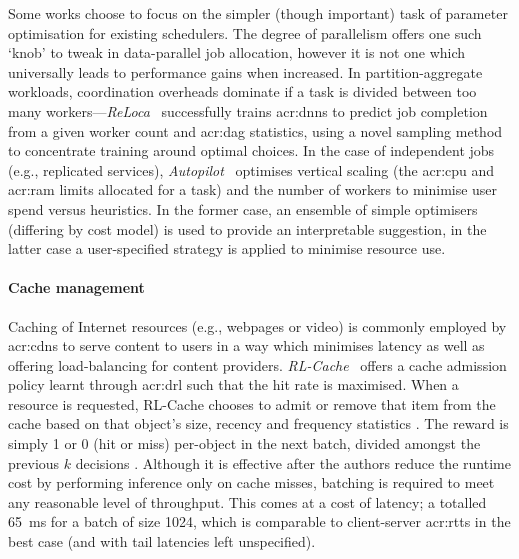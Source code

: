 Some works choose to focus on the simpler (though important) task of parameter optimisation for existing schedulers.
The degree of parallelism offers one such `knob' to tweak in data-parallel job allocation, however it is not one which universally leads to performance gains when increased.
In partition-aggregate workloads, coordination overheads dominate if a task is divided between too many workers---\emph{ReLoca}~\parencite{DBLP:conf/infocom/HuLZC20} successfully trains \glspl{acr:dnn} to predict job completion from a given worker count and \gls{acr:dag} statistics, using a novel sampling method to concentrate training around optimal choices.
In the case of independent jobs (e.g., replicated services), \emph{Autopilot}~\parencite{DBLP:conf/eurosys/RzadcaFSZBKNSWH20} optimises vertical scaling (the \gls{acr:cpu} and \gls{acr:ram} limits allocated for a task) and the number of workers to minimise user spend versus heuristics.
In the former case, an ensemble of simple optimisers (differing by cost model) is used to provide an interpretable suggestion, in the latter case a user-specified strategy is applied to minimise resource use.

\paragraph{Cache management}
Caching of Internet resources (e.g., webpages or video) is commonly employed by \glspl{acr:cdn} to serve content to users in a way which minimises latency as well as offering load-balancing for content providers.
\emph{RL-Cache}~\parencite{DBLP:journals/jsac/KirilinSGS20} offers a cache admission policy learnt through \gls{acr:drl} such that the hit rate is maximised.
When a resource is requested, RL-Cache chooses to admit or remove that item from the cache \prllitact{} based on that object's size, recency and frequency statistics \prllitstate.
The reward is simply 1 or 0 (hit or miss) per-object in the next batch, divided amongst the previous $k$ decisions \prllitreward.
Although it is effective after the authors reduce the runtime cost by performing inference only on cache misses, batching is required to meet any reasonable level of throughput.
This comes at a cost of latency; a totalled \qty{65}{\milli\second} for a batch of size \num{1024}, which is comparable to client-server \glspl{acr:rtt} in the best case (and with tail latencies left unspecified).

